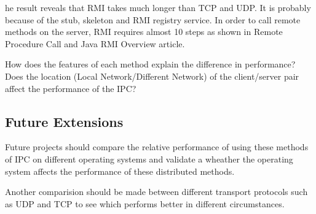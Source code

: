 \documentclass{article}
\begin{document}
he result reveals that RMI takes much longer than TCP and UDP. It is probably because of the stub, skeleton and RMI registry service. In order to call remote methods on the server, RMI requires almost 10 steps as shown in Remote Procedure Call and Java RMI Overview article.


How does the features of each method explain the difference in performance? \\


Does the location (Local Network/Different Network) of the client/server pair affect the performance of the IPC? \\



\subsection{Future Extensions}
Future projects should compare the relative performance of using these methods of IPC on different operating systems and validate a wheather the operating system affects the performance of these distributed methods. 

Another comparision should be made between different transport protocols such as UDP and TCP to see which performs better in different circumstances.







\end{document}
